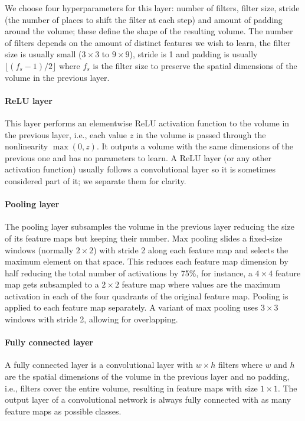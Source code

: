 We choose four hyperparameters for this layer: number of filters, filter size, stride (the number of places to shift the filter at each step) and amount of padding around the volume; these define the shape of the resulting volume. The number of filters depends on the amount of distinct features we wish to learn, the filter size is usually small ($3\times3$ to $9\times9$), stride is 1 and padding is usually $\lfloor (f_s-1)/2\rfloor$ where $f_s$ is the filter size to preserve the spatial dimensions of the volume in the previous layer.

\paragraph{ReLU layer} This layer performs an elementwise ReLU activation function to the volume in the previous layer, i.e., each value $z$ in the volume is passed through the nonlinearity $\max(0,z)$. It outputs a volume with the same dimensions of the previous one and has no parameters to learn. A ReLU layer (or any other activation function) usually follows a convolutional layer so it is sometimes considered part of it; we separate them for clarity. 

\paragraph{Pooling layer} The pooling layer subsamples the volume in the previous layer reducing the size of its feature maps but keeping their number. Max pooling slides a fixed-size windows (normally $2\times2$) with stride 2 along each feature map and selects the maximum element on that space. This reduces each feature map dimension by half reducing the total number of activations by 75\%, for instance, a $4\times4$ feature map gets subsampled to a $2\times 2$ feature map where values are the maximum activation in each of the four quadrants of the original feature map. Pooling is applied to each feature map separately. A variant of max pooling uses $3\times 3$ windows with stride 2, allowing for overlapping.

\paragraph{Fully connected layer} A fully connected layer is a convolutional layer with $w\times h$ filters where $w$ and $h$ are the spatial dimensions of the volume in the previous layer and no padding, i.e., filters cover the entire volume, resulting in feature maps with size $1 \times 1$. The output layer of a convolutional network is always fully connected with as many feature maps as possible classes.%

